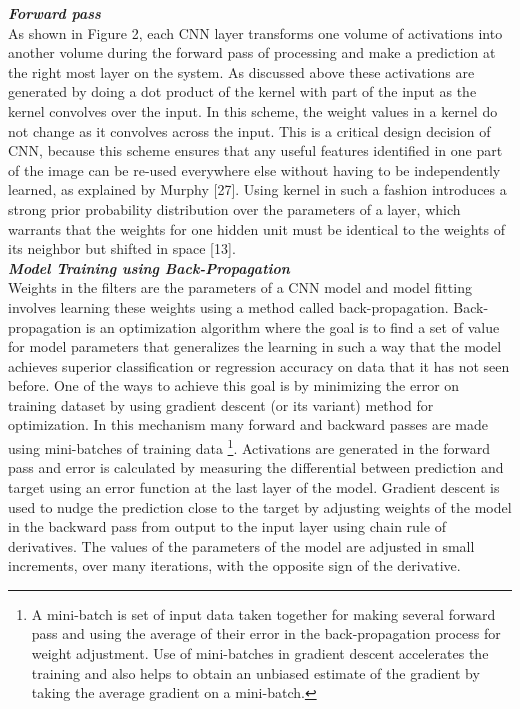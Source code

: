 \documentclass [11pt,letterpaper ,twoside ,openany ]{report}
\begin{document}
    \noindent
    \textbf{\textit{Forward pass}}\\
    As shown in Figure 2, each CNN layer transforms one volume of activations into another volume during the forward pass of processing and make a prediction at the right most layer on the system. As discussed above these activations are generated by doing a dot product of the kernel with part of the input as the kernel convolves over the input. In this scheme, the weight values in a kernel do not change as it convolves across the input. This is a critical design decision of CNN, because this scheme ensures that any useful features identified in one part of the image can be re-used everywhere else without having to be independently learned, as explained by Murphy [27]. Using kernel in such a fashion introduces a strong prior probability distribution over the parameters of a layer, which warrants that the weights for one hidden unit must be identical to the weights of its neighbor but shifted in space [13].\\

    \noindent
    \textbf{\textit{Model Training using Back-Propagation}} \\
    Weights in the filters are the parameters of a CNN model and model fitting involves learning these weights using a method called back-propagation. Back-propagation is an optimization algorithm where the goal is to find a set of value for model parameters that generalizes the learning in such a way that the model achieves superior classification or regression accuracy on data that it has not seen before. One of the ways to achieve this goal is by minimizing the error on training dataset by using gradient descent (or its variant) method for optimization. In this mechanism many forward and backward passes are made using mini-batches of training data \footnote{ A mini-batch is set of input data taken together for making several forward pass and using the average of their error in the back-propagation process for weight adjustment. Use of mini-batches in gradient descent accelerates the training and also helps to obtain an unbiased estimate of the gradient by taking the average gradient on a mini-batch.}. Activations are generated in the forward pass and error is calculated by measuring the differential between prediction and target using an error function at the last layer of the model. Gradient descent is used to nudge the prediction close to the target by adjusting weights of the model in the backward pass from output to the input layer using chain rule of derivatives. The values of the parameters of the model are adjusted in small increments, over many iterations, with the opposite sign of the derivative.
\end{document}
